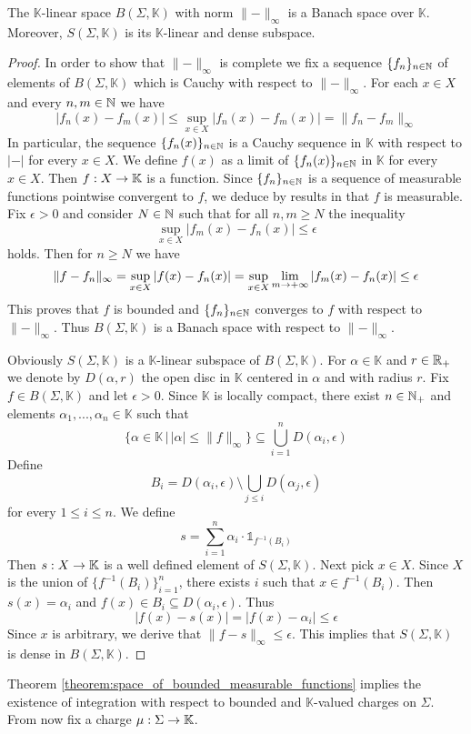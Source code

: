 \begin{theorem}\label{theorem:space_of_bounded_measurable_functions}
    The $\mathbb{K}$-linear space $B(\Sigma,\mathbb{K})$ with norm $\lVert-\rVert_{\infty}$ is a Banach space over $\mathbb{K}$. Moreover, $S(\Sigma,\mathbb{K})$ is its $\mathbb{K}$-linear and dense subspace.
\end{theorem}
\begin{proof}
    In order to show that $\lVert-\rVert_{\infty}$ is complete we fix a sequence $\{f_n\}_{n\in {\mathbb N}}$ of elements of $B(\Sigma,\mathbb{K})$ which is Cauchy with respect to $\lVert-\rVert_{\infty}$. For each $x \in X$ and every $n,m\in {\mathbb N}$ we have
    $$|f_n(x) - f_m(x)|\leq \sup_{x\in X}|f_n(x) - f_m(x)| = \lVert f_n - f_m \rVert_{\infty}$$
    In particular, the sequence $\{f_n(x)\}_{n\in {\mathbb N}}$ is a Cauchy sequence in $\mathbb{K}$ with respect to $|-|$ for every $x \in X$. We define $f(x)$ as a limit of $\{f_n(x)\}_{n\in {\mathbb N}}$ in $\mathbb{K}$ for every $x \in X$. Then $f:X\rightarrow \mathbb{K}$ is a function. Since $\{f_n\}_{n\in {\mathbb N}}$ is a sequence of measurable functions pointwise convergent to $f$, we deduce by results in \cite{Integration} that $f$ is measurable. Fix $\epsilon > 0$ and consider $N \in {\mathbb N}$ such that for all $n,m\geq N$ the inequality
    $$\sup_{x\in X}|f_m(x) - f_n(x)|\leq \epsilon$$
    holds. Then for $n \geq N$ we have
    $$\lVert f - f_n \rVert_{\infty} = \sup_{x\in X}|f(x) - f_n(x)| = \sup_{x\in X}\lim_{m\rightarrow +\infty}|f_m(x) - f_n(x)| \leq \epsilon$$
    This proves that $f$ is bounded and $\{f_n\}_{n\in {\mathbb N}}$ converges to $f$ with respect to $\lVert -\rVert_{\infty}$. Thus $B(\Sigma,\mathbb{K})$ is a Banach space with respect to $\lVert-\rVert_{\infty}$.

    Obviously $S(\Sigma,\mathbb{K})$ is a $\mathbb{K}$-linear subspace of $B(\Sigma,\mathbb{K})$. For $\alpha \in \mathbb{K}$ and $r \in {\mathbb R}_+$ we denote by $D(\alpha,r)$ the open disc in $\mathbb{K}$ centered in $\alpha$ and with radius $r$. Fix $f \in B(\Sigma,\mathbb{K})$ and let $\epsilon > 0$. Since $\mathbb{K}$ is locally compact, there exist $n\in {\mathbb N}_+$ and elements $\alpha_1,...,\alpha_n \in \mathbb{K}$ such that
    $$\big\{\alpha \in \mathbb{K}\,\big|\,|\alpha| \leq \lVert f\rVert_{\infty}\big\}\subseteq \bigcup_{i=1}^nD(\alpha_i,\epsilon)$$
    Define
    $$B_i = D(\alpha_i,\epsilon)\setminus \bigcup_{j\leq i}D(\alpha_j,\epsilon)$$
    for every $1\leq i \leq n$. We define
    $$s = \sum_{i=1}^n\alpha_i\cdot \mathbb{1}_{f^{-1}(B_i)}$$
    Then $s:X\rightarrow \mathbb{K}$ is a well defined element of $S(\Sigma,\mathbb{K})$. Next pick $x \in X$. Since $X$ is the union of $\{f^{-1}(B_i)\}_{i=1}^n$,
    there exists $i$ such that $x \in f^{-1}(B_i)$. Then $s(x) = \alpha_i$ and $f(x) \in B_i\subseteq D(\alpha_i,\epsilon)$. Thus
    $$|f(x) - s(x)| = |f(x) - \alpha_i|\leq \epsilon$$
    Since $x$ is arbitrary, we derive that $\lVert f - s\rVert_{\infty} \leq \epsilon$. This implies that $S(\Sigma,\mathbb{K})$ is dense in $B(\Sigma,\mathbb{K})$.
\end{proof}
\noindent
Theorem \ref{theorem:space_of_bounded_measurable_functions} implies the existence of integration with respect to bounded and $\mathbb{K}$-valued charges on $\Sigma$. From now fix a charge $\mu:\Sigma \rightarrow \mathbb{K}$.

